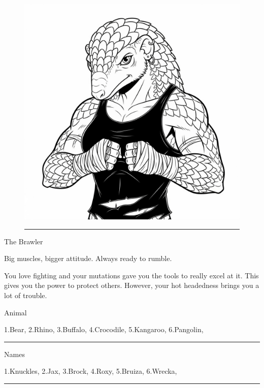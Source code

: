 \documentclass{article}
\begin{document}
\vspace*{\fill}

\begin{figure}[h!]
\centering\includegraphics[width=12cm]{images/brawler.png}
\vspace{-\baselineskip}\vspace{+0.1pt}
\rule{\linewidth}{2pt}
\end{figure}
\Huge{}The Brawler

\normalfont\large
\medskip

Big muscles, bigger attitude. Always ready to rumble.

\medskip

You love fighting and your mutations gave you the tools to really excel at it. This gives you the power to protect others. However, your hot headedness brings you a lot of trouble.

\newpage

\Large{}Animal

\medskip

\normalfont\large 1.Bear, 2.Rhino, 3.Buffalo, 4.Crocodile, 5.Kangaroo, 6.Pangolin, \rule{2cm}{1pt}

\medskip

\Large{}Names

\medskip

\normalfont\large 1.Knuckles, 2.Jax, 3.Brock, 4.Roxy, 5.Bruiza, 6.Wrecka, \rule{2cm}{1pt}
\end{document}
